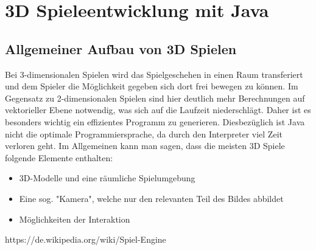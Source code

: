 \chapter{3D Spieleentwicklung mit Java}\label{ch:beispiele}

\section{Allgemeiner Aufbau von 3D Spielen}\label{sec:aufbau}

Bei 3-dimensionalen Spielen wird das Spielgeschehen in einen Raum transferiert und dem Spieler die Möglichkeit gegeben sich dort frei bewegen zu können. \newline
Im Gegensatz zu 2-dimensionalen Spielen sind hier deutlich mehr Berechnungen auf vektorieller Ebene notwendig, was sich auf die Laufzeit niederschlägt. Daher ist es besonders wichtig ein effizientes Programm zu generieren.
Diesbezüglich ist Java nicht die optimale Programmiersprache, da durch den Interpreter viel Zeit verloren geht.
\linebreak
Im Allgemeinen kann man sagen, dass die meisten 3D Spiele folgende Elemente enthalten:
\begin{itemize}
	\item 3D-Modelle und eine räumliche Spielumgebung
	\item Eine sog. "Kamera", welche nur den relevanten Teil des Bildes abbildet
	\item Möglichkeiten der Interaktion
\end{itemize}



\bigskip
https://de.wikipedia.org/wiki/Spiel-Engine





